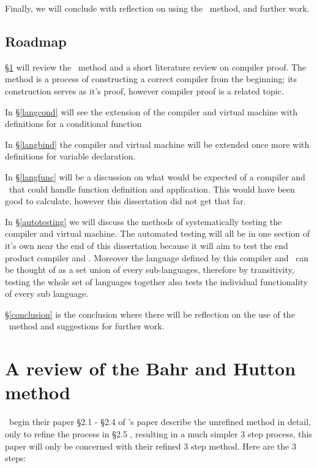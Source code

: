 \documentclass {article}
\begin{document}
Finally, we will conclude with 
reflection on using the \BH\ method,
and further work.

\subsection{Roadmap}

\S\ref{bhrev} will review the \BH\ method 
and a short literature review on compiler
proof. The \BH method is
a process of constructing a correct 
compiler from the beginning; its construction
serves as it's proof,
however compiler proof is a related topic.

In \S\ref{langcond} will see the extension of the compiler and
virtual machine with definitions for a conditional function

In \S\ref{langbind} the compiler and
virtual machine will be extended
 once more with definitions for variable declaration.
 
In \S\ref{langfunc} will be a discussion on what
would be expected of a compiler and \vm\ that
could handle function definition and application.
This would have been good to calculate, however
this dissertation did not get that far.

In \S\ref{autotesting} we will discuss the methods
of systematically testing the compiler and virtual machine.
The automated testing will all be in one section of it's own
near the end of this dissertation
because it will aim to test the end product compiler and \vm.
Moreover the language defined by this compiler and \vm\
can be thought of as a set union of every sub-languages,
therefore by transitivity, testing 
the whole set of languages together
also tests the individual functionality of every sub language.

\S\ref{conclusion} is the conclusion where there will
be reflection on the use of the \BH\ method and suggestions
for further work.

\pagebreak
\section{A review of the Bahr and Hutton method} \label{bhrev}

\BH\ begin their paper \S2.1 - \S2.4 of \BH's paper describe the unrefined 
method in detail, only to refine the process
in \S2.5 \cite[Combining the transformation steps]{bandh},
resulting in a much simpler 3 step process, 
this paper will only be concerned with
their refined 3 step method\cite[page 12]{bandh}.
Here are the 3 steps:
\end{document}
